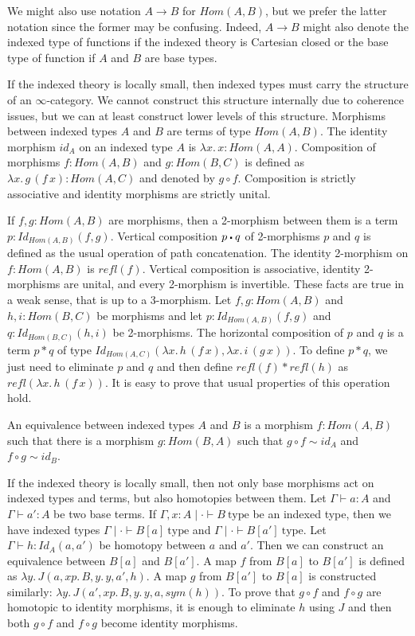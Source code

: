 \documentclass[reqno]{amsart}
\theoremstyle{definition}
\theoremstyle{remark}
\newcommand{\ob}{\mathrm{type}}
\newcommand{\fs}[1]{\mathit{#1}}
\newcommand{\Hom}{\fs{Hom}}
\newcommand{\Id}{\fs{Id}}
\newcommand{\refl}{\fs{refl}}
\newcommand{\sym}{\fs{sym}}
\newcommand{\id}{\fs{id}}
\numberwithin{figure}{section}
\newcommand{\ct}{%
  \mathchoice{\mathbin{\raisebox{0.25ex}{$\displaystyle\centerdot$}}}%
             {\mathbin{\raisebox{0.25ex}{$\centerdot$}}}%
             {\mathbin{\raisebox{0.25ex}{$\scriptstyle\,\centerdot\,$}}}%
             {\mathbin{\raisebox{0.25ex}{$\scriptscriptstyle\,\centerdot\,$}}}
}
\begin{document}
We might also use notation $A \to B$ for $\Hom(A,B)$, but we prefer the latter notation since the former may be confusing.
Indeed, $A \to B$ might also denote the indexed type of functions if the indexed theory is Cartesian closed or the base type of function if $A$ and $B$ are base types.

If the indexed theory is locally small, then indexed types must carry the structure of an $\infty$-category.
We cannot construct this structure internally due to coherence issues, but we can at least construct lower levels of this structure.
Morphisms between indexed types $A$ and $B$ are terms of type $\Hom(A,B)$.
The identity morphism $\id_A$ on an indexed type $A$ is $\lambda x.\,x : \Hom(A,A)$.
Composition of morphisms $f : \Hom(A,B)$ and $g : \Hom(B,C)$ is defined as $\lambda x.\,g\,(f\,x) : \Hom(A,C)$ and denoted by $g \circ f$.
Composition is strictly associative and identity morphisms are strictly unital.

If $f,g : \Hom(A,B)$ are morphisms, then a 2-morphism between them is a term $p : \Id_{\Hom(A,B)}(f,g)$.
Vertical composition $p \ct q$ of 2-morphisms $p$ and $q$ is defined as the usual operation of path concatenation.
The identity 2-morphism on $f : \Hom(A,B)$ is $\refl(f)$.
Vertical composition is associative, identity 2-morphisms are unital, and every 2-morphism is invertible.
These facts are true in a weak sense, that is up to a 3-morphism.
Let $f,g : \Hom(A,B)$ and $h,i : \Hom(B,C)$ be morphisms and let $p : \Id_{\Hom(A,B)}(f,g)$ and $q : \Id_{\Hom(B,C)}(h,i)$ be 2-morphisms.
The horizontal composition of $p$ and $q$ is a term $p * q$ of type $\Id_{\Hom(A,C)}(\lambda x.\,h\,(f\,x), \lambda x.\,i\,(g\,x))$.
To define $p * q$, we just need to eliminate $p$ and $q$ and then define $\refl(f) * \refl(h)$ as $\refl(\lambda x.\,h\,(f\,x))$.
It is easy to prove that usual properties of this operation hold.

\begin{defn}
An equivalence between indexed types $A$ and $B$ is a morphism $f : \Hom(A,B)$ such that there is a morphism $g : \Hom(B,A)$ such that $g \circ f \sim \id_A$ and $f \circ g \sim \id_B$.
\end{defn}

If the indexed theory is locally small, then not only base morphisms act on indexed types and terms, but also homotopies between them.
Let $\Gamma \vdash a : A$ and $\Gamma \vdash a' : A$ be two base terms.
If $\Gamma, x : A \mid \cdot \vdash B\ \ob$ be an indexed type, then we have indexed types $\Gamma \mid \cdot \vdash B[a]\ \ob$ and $\Gamma \mid \cdot \vdash B[a']\ \ob$.
Let $\Gamma \vdash h : \Id_A(a,a')$ be homotopy between $a$ and $a'$.
Then we can construct an equivalence between $B[a]$ and $B[a']$.
A map $f$ from $B[a]$ to $B[a']$ is defined as $\lambda y.\,J(a, x p.\,B, y.\,y, a', h)$.
A map $g$ from $B[a']$ to $B[a]$ is constructed similarly: $\lambda y.\,J(a', x p.\,B, y.\,y, a, \sym(h))$.
To prove that $g \circ f$ and $f \circ g$ are homotopic to identity morphisms, it is enough to eliminate $h$ using $J$ and then both $g \circ f$ and $f \circ g$ become identity morphisms.
\end{document}
